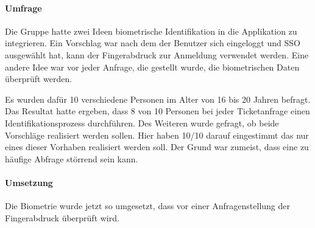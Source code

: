 \paragraph{Umfrage} Die Gruppe hatte zwei Ideen biometrische Identifikation in die Applikation zu integrieren. Ein Vorschlag war nach dem der Benutzer sich eingeloggt und SSO ausgewählt hat, kann der Fingerabdruck zur Anmeldung verwendet werden.
Eine andere Idee war vor jeder Anfrage, die gestellt wurde, die biometrischen Daten überprüft werden.

Es wurden dafür 10 verschiedene Personen im Alter von 16 bis 20 Jahren befragt. Das Resultat hatte ergeben, dass 8 von 10 Personen bei jeder Ticketanfrage einen Identifikationsprozess durchführen.
Des Weiteren wurde gefragt, ob beide Vorschläge realisiert werden sollen. Hier haben 10/10 darauf eingestimmt das nur eines dieser Vorhaben realisiert werden soll. Der Grund war zumeist, dass eine zu häufige Abfrage störrend sein kann.

\paragraph{Umsetzung} Die Biometrie wurde jetzt so umgesetzt, dass vor einer Anfragenstellung der Fingerabdruck überprüft wird.
